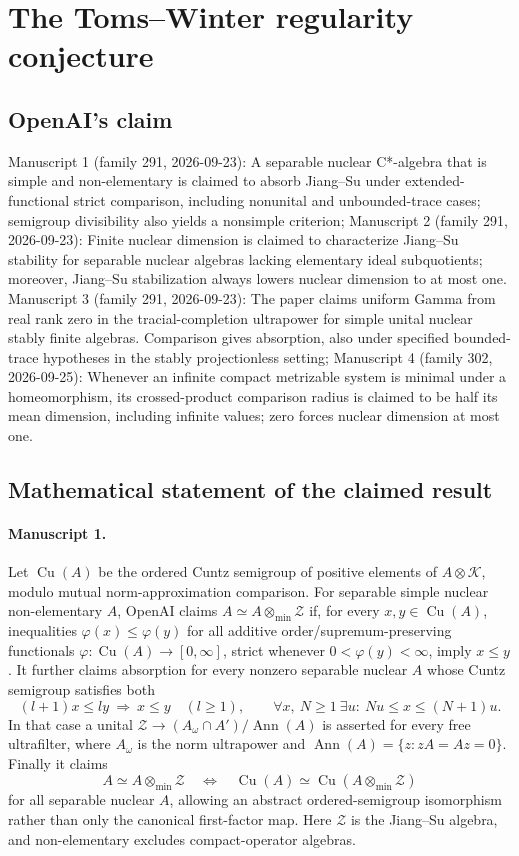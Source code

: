\documentclass[11pt]{article}
\begin{document}
\section*{The Toms–Winter regularity conjecture}

\subsection{OpenAI's claim}
Manuscript 1 (family 291, 2026-09-23): A separable nuclear C*-algebra that is simple and non-elementary is claimed to absorb Jiang--Su under extended-functional strict comparison, including nonunital and unbounded-trace cases; semigroup divisibility also yields a nonsimple criterion; Manuscript 2 (family 291, 2026-09-23): Finite nuclear dimension is claimed to characterize Jiang--Su stability for separable nuclear algebras lacking elementary ideal subquotients; moreover, Jiang--Su stabilization always lowers nuclear dimension to at most one. Manuscript 3 (family 291, 2026-09-23): The paper claims uniform Gamma from real rank zero in the tracial-completion ultrapower for simple unital nuclear stably finite algebras. Comparison gives absorption, also under specified bounded-trace hypotheses in the stably projectionless setting; Manuscript 4 (family 302, 2026-09-25): Whenever an infinite compact metrizable system is minimal under a homeomorphism, its crossed-product comparison radius is claimed to be half its mean dimension, including infinite values; zero forces nuclear dimension at most one.

\subsection{Mathematical statement of the claimed result}
\paragraph{Manuscript 1.}
Let $\operatorname{Cu}(A)$ be the ordered Cuntz semigroup of positive elements of $A\otimes\mathcal K$, modulo mutual norm-approximation comparison. For separable simple nuclear non-elementary $A$, OpenAI claims $A\simeq A\otimes_{\min}\mathcal Z$ if, for every $x,y\in\operatorname{Cu}(A)$, inequalities $\varphi(x)\le\varphi(y)$ for all additive order/supremum-preserving functionals $\varphi:\operatorname{Cu}(A)\to[0,\infty]$, strict whenever $0<\varphi(y)<\infty$, imply $x\le y$.
It further claims absorption for every nonzero separable nuclear $A$ whose Cuntz semigroup satisfies both
\[
(l+1)x\le ly\ \Longrightarrow\ x\le y\quad(l\ge1),\qquad
\forall x,\ N\ge1\ \exists u:\ Nu\le x\le(N+1)u.
\]
In that case a unital $\mathcal Z\to (A_\omega\cap A')/\operatorname{Ann}(A)$ is asserted for every free ultrafilter, where $A_\omega$ is the norm ultrapower and $\operatorname{Ann}(A)=\{z:zA=Az=0\}$. Finally it claims
\[
A\simeq A\otimes_{\min}\mathcal Z\quad\Longleftrightarrow\quad
\operatorname{Cu}(A)\simeq\operatorname{Cu}(A\otimes_{\min}\mathcal Z)
\]
for all separable nuclear $A$, allowing an abstract ordered-semigroup isomorphism rather than only the canonical first-factor map. Here $\mathcal Z$ is the Jiang--Su algebra, and non-elementary excludes compact-operator algebras.
\end{document}
